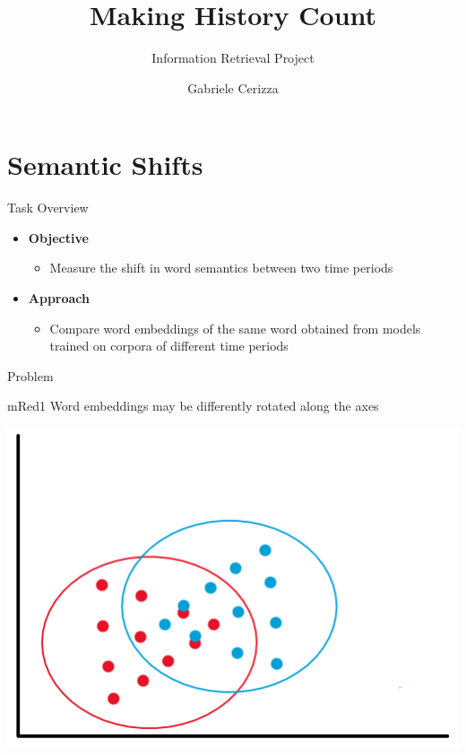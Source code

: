 \documentclass[10pt,aspectratio=1610,professionalfont]{beamer}
\title{Making History Count}
\subtitle{Information Retrieval Project}
\author{Gabriele Cerizza}
\date{}
\institute{\textit{Università degli Studi di Milano}}
\begin{document}
\maketitle


\section{Semantic Shifts}

\begin{frame}{Task Overview}
    \begin{itemize}
        \item \textbf{Objective}
        \begin{itemize}
            \item Measure the shift in word semantics between two time periods 
        \end{itemize}
        \item \textbf{Approach}
        \begin{itemize}
            \item Compare word embeddings of the same word obtained from models trained on corpora of different time periods 
        \end{itemize} 
    \end{itemize}
    \begin{minipage}{.5\linewidth}
        \alert{Problem}
        \begin{highlightbox}{mRed}{1}
			Word embeddings may be differently rotated along the axes
		\end{highlightbox}
    \end{minipage}
    \hfill
    \begin{minipage}{.4\linewidth}
        \centering
        \includegraphics[scale=0.35]{img/alignment.PNG}
    \end{minipage}
\end{frame}
\end{document}
